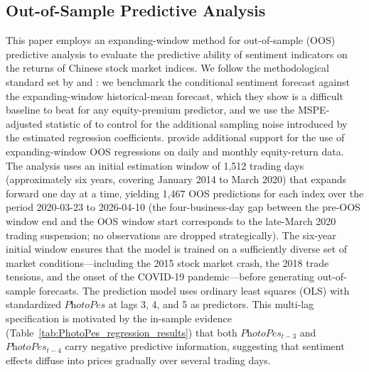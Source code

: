 \documentclass[AER]{AEA}
\begin{document}
\subsection{Out-of-Sample Predictive Analysis}
This paper employs an expanding-window method for out-of-sample (OOS) predictive analysis to evaluate the predictive ability of sentiment indicators on the returns of Chinese stock market indices. We follow the methodological standard set by \citet{welch2008comprehensive} and \citet{campbell2008predicting}: we benchmark the conditional sentiment forecast against the expanding-window historical-mean forecast, which they show is a difficult baseline to beat for any equity-premium predictor, and we use the MSPE-adjusted statistic of \citet{clark2007approximately} to control for the additional sampling noise introduced by the estimated regression coefficients. \citet{rapach2010out} provide additional support for the use of expanding-window OOS regressions on daily and monthly equity-return data. The analysis uses an initial estimation window of 1{,}512 trading days (approximately six years, covering January 2014 to March 2020) that expands forward one day at a time, yielding 1{,}467 OOS predictions for each index over the period 2020-03-23 to 2026-04-10 (the four-business-day gap between the pre-OOS window end and the OOS window start corresponds to the late-March 2020 trading suspension; no observations are dropped strategically). The six-year initial window ensures that the model is trained on a sufficiently diverse set of market conditions---including the 2015 stock market crash, the 2018 trade tensions, and the onset of the COVID-19 pandemic---before generating out-of-sample forecasts. The prediction model uses ordinary least squares (OLS) with standardized $\textit{PhotoPes}$ at lags 3, 4, and 5 as predictors. This multi-lag specification is motivated by the in-sample evidence (Table~\ref{tab:PhotoPes_regression_results}) that both $\textit{PhotoPes}_{t-3}$ and $\textit{PhotoPes}_{t-4}$ carry negative predictive information, suggesting that sentiment effects diffuse into prices gradually over several trading days.
\end{document}
